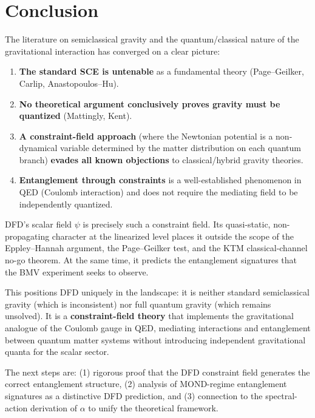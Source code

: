 \documentclass[12pt,a4paper]{article}
\begin{document}
\section{Conclusion}
\label{sec:conclusion}

The literature on semiclassical gravity and the quantum/classical nature of the gravitational interaction has converged on a clear picture:

\begin{enumerate}
\item \textbf{The standard SCE is untenable} as a fundamental theory (Page--Geilker, Carlip, Anastopoulos--Hu).
\item \textbf{No theoretical argument conclusively proves gravity must be quantized} (Mattingly, Kent).
\item \textbf{A constraint-field approach} (where the Newtonian potential is a non-dynamical variable determined by the matter distribution on each quantum branch) \textbf{evades all known objections} to classical/hybrid gravity theories.
\item \textbf{Entanglement through constraints} is a well-established phenomenon in QED (Coulomb interaction) and does not require the mediating field to be independently quantized.
\end{enumerate}

DFD's scalar field $\psi$ is precisely such a constraint field. Its quasi-static, non-propagating character at the linearized level places it outside the scope of the Eppley--Hannah argument, the Page--Geilker test, and the KTM classical-channel no-go theorem. At the same time, it predicts the entanglement signatures that the BMV experiment seeks to observe.

This positions DFD uniquely in the landscape: it is neither standard semiclassical gravity (which is inconsistent) nor full quantum gravity (which remains unsolved). It is a \textbf{constraint-field theory} that implements the gravitational analogue of the Coulomb gauge in QED, mediating interactions and entanglement between quantum matter systems without introducing independent gravitational quanta for the scalar sector.

The next steps are: (1) rigorous proof that the DFD constraint field generates the correct entanglement structure, (2) analysis of MOND-regime entanglement signatures as a distinctive DFD prediction, and (3) connection to the spectral-action derivation of $\alpha$ to unify the theoretical framework.
\end{document}
